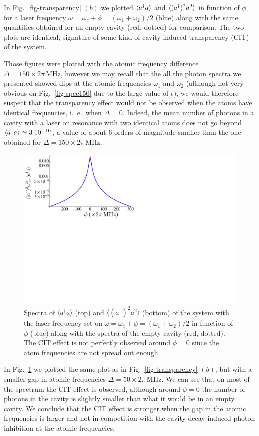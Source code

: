 In Fig.~\ref{fig-transparency} $(b)$ we plotted $\langle a^\dagger a \rangle$ and $\langle (a^\dagger)^2 a^2 \rangle$ in function of $\phi$ for a laser frequency $\omega = \omega_c + \phi = (\omega_1+\omega_2)/2$ (blue) along with the same quantities obtained for an empty cavity (red, dotted) for comparison. The two plots are identical, signature of some kind of cavity induced transparency (CIT) of the system.

Those figures were plotted with the atomic frequency difference $\Delta=150\times 2\pi\,\mbox{MHz}$, however we may recall that the all the photon spectra we presented showed dips at the atomic frequencies $\omega_1$ and $\omega_2$ (although not very obvious on Fig.~\ref{fig-spec150} due to the large value of $\epsilon$), we would therefore suspect that the transparency effect would not be observed  when the atoms have identical frequencies, i.~e.~when $\Delta=0$. Indeed, the mean number of photons in a cavity with a laser on resonance with two identical atoms does not go beyond $\langle a^\dagger a \rangle \simeq 3 \; 10^{-10}$, a value of about 6 orders of magnitude smaller than the one obtained for $\Delta=150\times 2\pi\,\mbox{MHz}$.

\begin{figure}
    \center
    \includegraphics[width=0.65 \textwidth]{Images/chap5/transparency50.pdf}
    \caption[$\langle a^\dagger a \rangle$  and $\langle (a^\dagger)^2 a^2 \rangle$ ]{Spectra of $\langle a^\dagger a \rangle$ (top) and $\langle (a^\dagger)^2 a^2 \rangle$ (bottom) of the system with the laser frequency set on $\omega = \omega_c + \phi = (\omega_1+\omega_2)/2$ in function of $\phi$ (blue) along with the spectra of the empty cavity (red, dotted). The CIT effect is not perfectly observed around $\phi=0$ since the atom frequencies are not spread out enough.}
    \label{fig-transparency50}
\end{figure}

In Fig.~\ref{fig-transparency50} we plotted the same plot as in Fig.~\ref{fig-transparency} $(b)$, but with a smaller gap in atomic frequencies $\Delta =50 \times 2\pi\,\mbox{MHz}$. We can see that on most of the spectrum the CIT effect is observed, although around $\phi=0$ the number of photons in the cavity is slightly smaller than what it would be in an empty cavity. We conclude that the CIT effect is stronger when the gap in the atomic frequencies is larger and not in competition with the cavity decay induced photon inhibition at the atomic frequencies.

